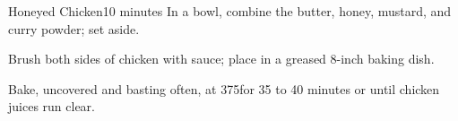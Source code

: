 \begin{recipe}{Honeyed Chicken}{10 minutes}{}
In a bowl, combine the butter, honey, mustard, and curry powder; set aside.

Brush both sides of chicken with sauce; place in a greased 8-inch baking
dish.\newstep

Bake, uncovered and basting often, at 375\degrees for 35 to 40 minutes or until
chicken juices run clear.

\end{recipe}
